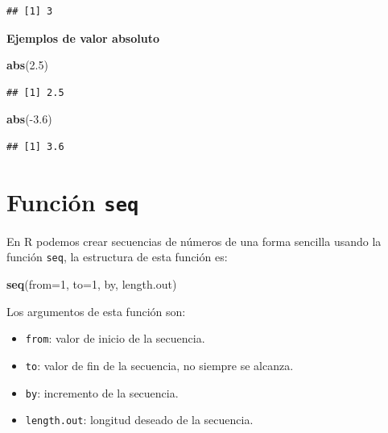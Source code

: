 \documentclass[10pt,]{krantz}
\makeatletter
\newenvironment{Shaded}{\begin{snugshade}}{\end{snugshade}}
\newcommand{\KeywordTok}[1]{\textcolor[rgb]{0.13,0.29,0.53}{\textbf{{#1}}}}
\newcommand{\DataTypeTok}[1]{\textcolor[rgb]{0.13,0.29,0.53}{{#1}}}
\newcommand{\DecValTok}[1]{\textcolor[rgb]{0.00,0.00,0.81}{{#1}}}
\newcommand{\FloatTok}[1]{\textcolor[rgb]{0.00,0.00,0.81}{{#1}}}
\newcommand{\NormalTok}[1]{{#1}}
\providecommand{\tightlist}{%
  \setlength{\itemsep}{0pt}\setlength{\parskip}{0pt}}
\let\proglang=\textsf
\newenvironment{kframe}{%
\medskip{}
\setlength{\fboxsep}{.8em}
 \def\at@end@of@kframe{}%
 \ifinner\ifhmode%
  \def\at@end@of@kframe{\end{minipage}}%
  \begin{minipage}{\columnwidth}%
 \fi\fi%
 \def\FrameCommand##1{\hskip\@totalleftmargin \hskip-\fboxsep
 \colorbox{shadecolor}{##1}\hskip-\fboxsep
     \hskip-\linewidth \hskip-\@totalleftmargin \hskip\columnwidth}%
 \MakeFramed {\advance\hsize-\width
   \@totalleftmargin\z@ \linewidth\hsize
   \@setminipage}}%
 {\par\unskip\endMakeFramed%
 \at@end@of@kframe}
\renewenvironment{Shaded}{\begin{kframe}}{\end{kframe}}
\makeatother
\begin{document}
\begin{verbatim}
## [1] 3
\end{verbatim}

\textbf{Ejemplos de valor absoluto}

\begin{Shaded}
\begin{Highlighting}[]
\KeywordTok{abs}\NormalTok{(}\FloatTok{2.5}\NormalTok{)}
\end{Highlighting}
\end{Shaded}

\begin{verbatim}
## [1] 2.5
\end{verbatim}

\begin{Shaded}
\begin{Highlighting}[]
\KeywordTok{abs}\NormalTok{(-}\FloatTok{3.6}\NormalTok{)}
\end{Highlighting}
\end{Shaded}

\begin{verbatim}
## [1] 3.6
\end{verbatim}

\section{\texorpdfstring{Función \texttt{seq} 
}{Función seq  }}\label{funcion-seq}

En \proglang{R} podemos crear secuencias de números de una forma
sencilla usando la función \texttt{seq}, la estructura de esta función
es:

\begin{Shaded}
\begin{Highlighting}[]
\KeywordTok{seq}\NormalTok{(}\DataTypeTok{from=}\DecValTok{1}\NormalTok{, }\DataTypeTok{to=}\DecValTok{1}\NormalTok{, by, length.out)}
\end{Highlighting}
\end{Shaded}

Los argumentos de esta función son:

\begin{itemize}
\tightlist
\item
  \texttt{from}: valor de inicio de la secuencia.
\item
  \texttt{to}: valor de fin de la secuencia, no siempre se alcanza.
\item
  \texttt{by}: incremento de la secuencia.
\item
  \texttt{length.out}: longitud deseado de la secuencia.
\end{itemize}
\end{document}
